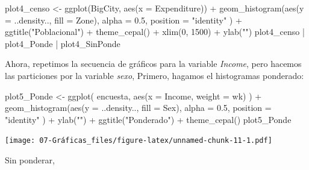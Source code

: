 \documentclass[
  12pt,
]{book}
\newenvironment{Shaded}{\begin{snugshade}}{\end{snugshade}}
\newcommand{\AttributeTok}[1]{\textcolor[rgb]{0.77,0.63,0.00}{#1}}
\newcommand{\DecValTok}[1]{\textcolor[rgb]{0.00,0.00,0.81}{#1}}
\newcommand{\FloatTok}[1]{\textcolor[rgb]{0.00,0.00,0.81}{#1}}
\newcommand{\FunctionTok}[1]{\textcolor[rgb]{0.00,0.00,0.00}{#1}}
\newcommand{\NormalTok}[1]{#1}
\newcommand{\OtherTok}[1]{\textcolor[rgb]{0.56,0.35,0.01}{#1}}
\newcommand{\SpecialCharTok}[1]{\textcolor[rgb]{0.00,0.00,0.00}{#1}}
\newcommand{\StringTok}[1]{\textcolor[rgb]{0.31,0.60,0.02}{#1}}
\begin{document}
\begin{Shaded}
\begin{Highlighting}[]
\NormalTok{plot4\_censo }\OtherTok{\textless{}{-}} \FunctionTok{ggplot}\NormalTok{(BigCity, }\FunctionTok{aes}\NormalTok{(}\AttributeTok{x =}\NormalTok{ Expenditure)) }\SpecialCharTok{+}
  \FunctionTok{geom\_histogram}\NormalTok{(}\FunctionTok{aes}\NormalTok{(}\AttributeTok{y =}\NormalTok{ ..density.., }\AttributeTok{fill =}\NormalTok{ Zone),}
    \AttributeTok{alpha =} \FloatTok{0.5}\NormalTok{, }\AttributeTok{position =} \StringTok{"identity"}
\NormalTok{  ) }\SpecialCharTok{+}
  \FunctionTok{ggtitle}\NormalTok{(}\StringTok{"Poblacional"}\NormalTok{) }\SpecialCharTok{+}
  \FunctionTok{theme\_cepal}\NormalTok{() }\SpecialCharTok{+}
  \FunctionTok{xlim}\NormalTok{(}\DecValTok{0}\NormalTok{, }\DecValTok{1500}\NormalTok{) }\SpecialCharTok{+}
  \FunctionTok{ylab}\NormalTok{(}\StringTok{""}\NormalTok{)}
\NormalTok{plot4\_censo }\SpecialCharTok{|}\NormalTok{ plot4\_Ponde }\SpecialCharTok{|}\NormalTok{ plot4\_SinPonde}
\end{Highlighting}
\end{Shaded}

Ahora, repetimos la secuencia de gráficos para la variable \emph{Income}, pero hacemos las particiones por la variable \emph{sexo}, Primero, hagamos el histogramas ponderado:

\begin{Shaded}
\begin{Highlighting}[]
\NormalTok{plot5\_Ponde }\OtherTok{\textless{}{-}} \FunctionTok{ggplot}\NormalTok{(}
\NormalTok{  encuesta,}
  \FunctionTok{aes}\NormalTok{(}\AttributeTok{x =}\NormalTok{ Income, }\AttributeTok{weight =}\NormalTok{ wk)}
\NormalTok{) }\SpecialCharTok{+}
  \FunctionTok{geom\_histogram}\NormalTok{(}\FunctionTok{aes}\NormalTok{(}\AttributeTok{y =}\NormalTok{ ..density.., }\AttributeTok{fill =}\NormalTok{ Sex),}
    \AttributeTok{alpha =} \FloatTok{0.5}\NormalTok{, }\AttributeTok{position =} \StringTok{"identity"}
\NormalTok{  ) }\SpecialCharTok{+}
  \FunctionTok{ylab}\NormalTok{(}\StringTok{""}\NormalTok{) }\SpecialCharTok{+}
  \FunctionTok{ggtitle}\NormalTok{(}\StringTok{"Ponderado"}\NormalTok{) }\SpecialCharTok{+}
  \FunctionTok{theme\_cepal}\NormalTok{()}
\NormalTok{plot5\_Ponde}
\end{Highlighting}
\end{Shaded}

\texttt{[image: 07-Gráficas\_files/figure-latex/unnamed-chunk-11-1.pdf]}

Sin ponderar,
\end{document}

